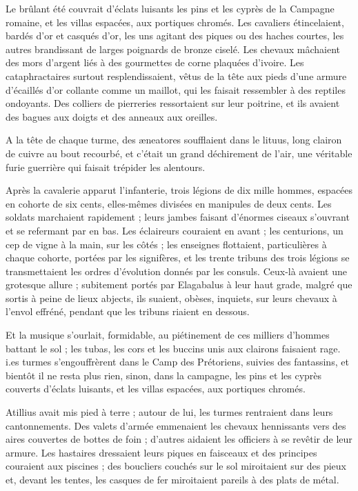 \documentclass[a4paper, 11pt, oneside, polutonikogreek, french]{article}
\begin{document}
Le brûlant été couvrait d'éclats luisants les pins et les cyprès de la Campagne romaine, et les villas espacées, aux portiques chromés. Les cavaliers étincelaient, bardés d'or et casqués d'or, les uns agitant des piques ou des haches courtes, les autres brandissant de larges poignards de bronze ciselé. Les chevaux mâchaient des mors d'argent liés à des gourmettes de corne plaquées d'ivoire. Les cataphractaires surtout resplendissaient, vêtus de la tête aux pieds d'une armure d'écaillés d'or collante comme un maillot, qui les faisait ressembler à des reptiles ondoyants. Des colliers de pierreries ressortaient sur leur poitrine, et ils avaient des bagues aux doigts et des anneaux aux oreilles.

A la tête de chaque turme, des æneatores soufflaient dans le lituus, long clairon de cuivre au bout recourbé, et c'était un grand déchirement de l'air, une véritable furie guerrière qui faisait trépider les alentours.

Après la cavalerie apparut l'infanterie, trois légions de dix mille hommes, espacées en cohorte de six cents, elles-mêmes divisées en manipules de deux cents. Les soldats marchaient rapidement ; leurs jambes faisant d'énormes ciseaux s'ouvrant et se refermant par en bas. Les éclaireurs couraient en avant ; les centurions, un cep de vigne à la main, sur les côtés ; les enseignes flottaient, particulières à chaque cohorte, portées par les signifères, et les trente tribuns des trois légions se transmettaient les ordres d'évolution donnés par les consuls. Ceux-là avaient une grotesque allure ; subitement portés par Elagabalus à leur haut grade, malgré que sortis à peine de lieux abjects, ils suaient, obèses, inquiets, sur leurs chevaux à l'envol effréné, pendant que les tribuns riaient en dessous.

Et la musique s'ourlait, formidable, au piétinement de ces milliers d'hommes battant le sol ; les tubas, les cors et les buccins unis aux clairons faisaient rage. i.es turmes s'engouffrèrent dans le Camp des Prétoriens, suivies des fantassins, et bientôt il ne resta plus rien, sinon, dans la campagne, les pins et les cyprès couverts d'éclats luisants, et les villas espacées, aux portiques chromés.

Atillius avait mis pied à terre ; autour de lui, les turmes rentraient dans leurs cantonnements. Des valets d'armée emmenaient les chevaux hennissants vers des aires couvertes de bottes de foin ; d'autres aidaient les officiers à se revêtir de leur armure. Les hastaires dressaient leurs piques en faisceaux et des principes couraient aux piscines ; des boucliers couchés sur le sol miroitaient sur des pieux et, devant les tentes, les casques de fer miroitaient pareils à des plats de métal.
\end{document}
